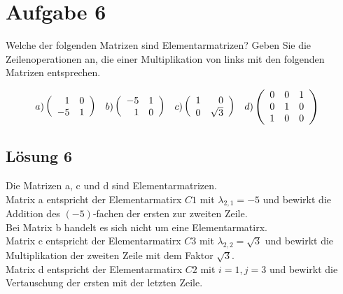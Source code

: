 \documentclass[main.tex]{subfiles}
\begin{document}
\section{Aufgabe 6}
Welche der folgenden Matrizen sind Elementarmatrizen? Geben Sie die Zeilenoperationen an, 
die einer Multiplikation von links mit den folgenden Matrizen entsprechen.

\begin{align*}
    a) & 
    \eqmatrix{rr}{
         1 & 0 \\
        -5 & 1
    } &
    b) & 
    \eqmatrix{rr}{
        -5 & 1 \\
         1 & 0
    } &
    c) & 
    \eqmatrix{rr}{
         1 & 0 \\
         0 & \sqrt{3}
    } &
    d) & 
    \eqmatrix{ccc}{
        0 & 0 & 1 \\
        0 & 1 & 0 \\
        1 & 0 & 0
    }
\end{align*}

\subsection{Lösung 6}

Die Matrizen a, c und d sind Elementarmatrizen. \\

Matrix a entspricht der Elementarmatirx $C1$ mit $\lambda_{2,1} = -5$ und bewirkt die Addition des $(-5)$-fachen der ersten zur zweiten Zeile.\\

Bei Matrix b handelt es sich nicht um eine Elementarmatirx. \\

Matrix c entspricht der Elementarmatirx $C3$ mit $\lambda_{2,2} = \sqrt{3}$ und bewirkt die Multiplikation der zweiten Zeile mit dem Faktor $\sqrt{3}$.\\

Matrix d entspricht der Elementarmatirx $C2$ mit $i=1, j=3$ und bewirkt die Vertauschung der ersten mit der letzten Zeile.\\
\end{document}
